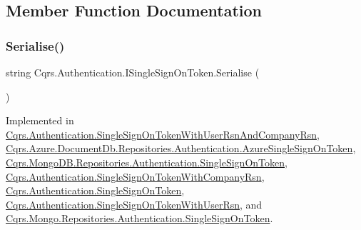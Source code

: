 \subsection{Member Function Documentation}
\mbox{\label{interfaceCqrs_1_1Authentication_1_1ISingleSignOnToken_af34e8c0b052865d687064d3381bfbcdb_af34e8c0b052865d687064d3381bfbcdb}} 
\subsubsection{\texorpdfstring{Serialise()}{Serialise()}}
{\footnotesize\ttfamily string Cqrs.\+Authentication.\+I\+Single\+Sign\+On\+Token.\+Serialise (\begin{DoxyParamCaption}{ }\end{DoxyParamCaption})}



Implemented in \hyperlink{classCqrs_1_1Authentication_1_1SingleSignOnTokenWithUserRsnAndCompanyRsn_a8d44249c00e5264dc7b37f4868836a80_a8d44249c00e5264dc7b37f4868836a80}{Cqrs.\+Authentication.\+Single\+Sign\+On\+Token\+With\+User\+Rsn\+And\+Company\+Rsn}, \hyperlink{classCqrs_1_1Azure_1_1DocumentDb_1_1Repositories_1_1Authentication_1_1AzureSingleSignOnToken_a55c07b93600e6863985b50d4df346af0_a55c07b93600e6863985b50d4df346af0}{Cqrs.\+Azure.\+Document\+Db.\+Repositories.\+Authentication.\+Azure\+Single\+Sign\+On\+Token}, \hyperlink{classCqrs_1_1MongoDB_1_1Repositories_1_1Authentication_1_1SingleSignOnToken_a2392ecdb53f1f2a38a67d80a77f11ba4_a2392ecdb53f1f2a38a67d80a77f11ba4}{Cqrs.\+Mongo\+D\+B.\+Repositories.\+Authentication.\+Single\+Sign\+On\+Token}, \hyperlink{classCqrs_1_1Authentication_1_1SingleSignOnTokenWithCompanyRsn_a0bc9f0fae90121d029fe0730708f4210_a0bc9f0fae90121d029fe0730708f4210}{Cqrs.\+Authentication.\+Single\+Sign\+On\+Token\+With\+Company\+Rsn}, \hyperlink{classCqrs_1_1Authentication_1_1SingleSignOnToken_a5e859c6c5db5aaa9ef4e8f2086df4604_a5e859c6c5db5aaa9ef4e8f2086df4604}{Cqrs.\+Authentication.\+Single\+Sign\+On\+Token}, \hyperlink{classCqrs_1_1Authentication_1_1SingleSignOnTokenWithUserRsn_a8103820e6352c10b3990fb027dd9b5ae_a8103820e6352c10b3990fb027dd9b5ae}{Cqrs.\+Authentication.\+Single\+Sign\+On\+Token\+With\+User\+Rsn}, and \hyperlink{classCqrs_1_1Mongo_1_1Repositories_1_1Authentication_1_1SingleSignOnToken_ab0ad6b0a6065a2553a093214e5a033b5_ab0ad6b0a6065a2553a093214e5a033b5}{Cqrs.\+Mongo.\+Repositories.\+Authentication.\+Single\+Sign\+On\+Token}.



